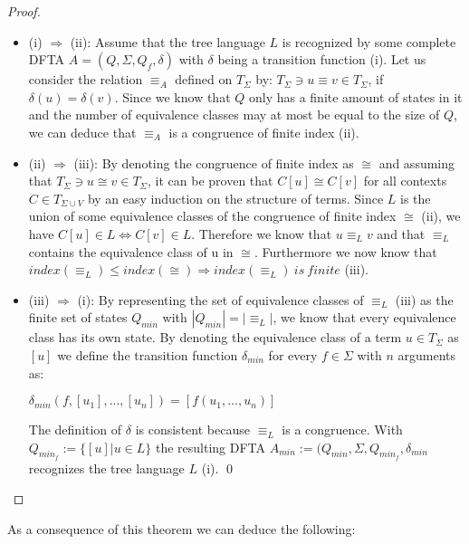 \documentclass{llncs}
\begin{document}
\begin{proof}{~}
	\begin{itemize}
		\item (i) \(\Rightarrow\) (ii): Assume that the tree language \(L\) is recognized by some complete DFTA \(A = (Q, \Sigma, Q_f, \delta)\) with \(\delta\) being a transition function (i).
		Let us consider the relation \(\equiv_A\) defined on \(T_\Sigma\) by: \(T_\Sigma \ni u \equiv v \in T_\Sigma\), if \(\delta(u) = \delta(v)\). Since we know that \(Q\) only has a finite amount of states in it and the number of equivalence classes may at most be equal to the size of \(Q\), we can deduce that \(\equiv_A\) is a congruence of finite index (ii).
		\\
		\item (ii) \(\Rightarrow\) (iii): By denoting the congruence of finite index as \(\cong\) and assuming that \(T_\Sigma \ni u \cong v \in T_\Sigma\), it can be proven that \(C[u] \cong C[v]\) for all contexts \(C \in T_{\Sigma \cup V} \) by an easy induction on the structure of terms. Since \(L\) is the union of some equivalence classes of the congruence of finite index \(\cong\) (ii), we have \(C[u] \in L \iff C[v] \in L \). Therefore we know that  \( u \equiv_L v \) and that \( \equiv_L \) contains the equivalence class of u in \( \cong \). Furthermore we now know that \(index(\equiv_L) \leq index(\cong) \Rightarrow index(\equiv_L)~is~finite \) (iii).
		\\
		\item (iii) \(\Rightarrow\) (i):
		 By representing the set of equivalence classes of \( \equiv_L \) (iii) as the finite set of states \(Q_{min}\) with \(|Q_{min}| = |\equiv_L|\), we know that every equivalence class has its own state. By denoting the equivalence class of a term \(u \in T_\Sigma\) as \([u]\) we define the transition function \(\delta_{min}\) for every \( f \in \Sigma\) with \(n\) arguments as:
		 \begin{center}
			 \(\delta_{min}(f, [u_1], ..., [u_n]) = [f(u_1, ..., u_n)]\)
		 \end{center}
		 The definition of \(\delta\) is consistent because \(\equiv_L\) is a congruence. With \(Q_{min_f} := \{ [u] | u \in L \}\) the resulting DFTA \(A_{min} := (Q_{min}, \Sigma, Q_{min_f}, \delta_{min}\) recognizes the tree language \(L\) (i). 
		 \qed
	\end{itemize}
\end{proof}

\pagebreak

As a consequence of this theorem we can deduce the following:
\end{document}
